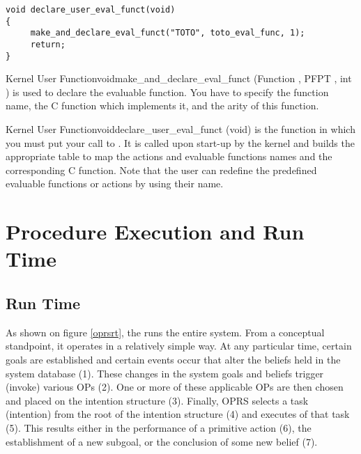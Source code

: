 \begin{verbatim}
void declare_user_eval_funct(void)
{
     make_and_declare_eval_funct("TOTO", toto_eval_func, 1);
     return;
}
\end{verbatim}

\begin{typefn}{Kernel User Function}{void}{make\_and\_declare\_eval\_funct}
{(Function , PFPT , int )}
is used to declare the evaluable function. You have to specify the function
name, the C function which implements it, and the arity of this function.
\end{typefn}

\begin{typefn}{Kernel User Function}{void}{declare\_user\_eval\_funct} {(void)}
is the function in which you must put your call to
. It is called upon start-up by the
kernel and builds the appropriate table to map the actions and evaluable
functions names and the corresponding C function.  Note that the user can
redefine the predefined evaluable functions or actions by using their
name.
\end{typefn}

\chapter{Procedure Execution and Run Time}



\section{Run Time}


As shown on figure \ref{oprsrt}, the \CPK{} runs the entire system. From a
conceptual standpoint, it operates in a relatively simple way. At any
particular time, certain goals are established and certain events occur
that alter the beliefs held in the system database (1). These changes in
the system goals and beliefs trigger (invoke) various OPs (2). One or more
of these applicable OPs are then chosen and placed on the intention
structure (3). Finally, OPRS selects a task (intention) from the root of
the intention structure (4) and executes  of that task (5).
This results either in the performance of a primitive action (6), the
establishment of a new subgoal, or the conclusion of some new belief (7).

